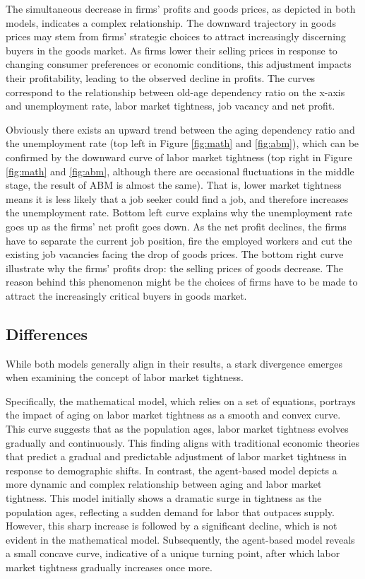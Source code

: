 \documentclass[ %
    final,
    scrbook,
    listoffigures,
    listoftables, 
    glossary]{cu-thesis}
\begin{document}
The simultaneous decrease in firms' profits and goods prices, as depicted in both models, indicates a complex relationship. The downward trajectory in goods prices may stem from firms' strategic choices to attract increasingly discerning buyers in the goods market. As firms lower their selling prices in response to changing consumer preferences or economic conditions, this adjustment impacts their profitability, leading to the observed decline in profits.
The curves correspond to the relationship between old-age dependency ratio on the x-axis and unemployment rate, labor market tightness, job vacancy and net profit. 
\fi

Obviously there exists an upward trend between the aging dependency ratio and the unemployment rate (top left in Figure \ref{fig:math} and \ref{fig:abm}), which can be confirmed by the downward curve of labor market tightness (top right in Figure \ref{fig:math} and \ref{fig:abm}, although there are occasional fluctuations in the middle stage, the result of ABM is almost the same). That is, lower market tightness means it is less likely that a job seeker could find a job, and therefore increases the unemployment rate. Bottom left curve explains why the unemployment rate goes up as the firms' net profit goes down. As the net profit declines, the firms have to separate the current job position, fire the employed workers and cut the existing job vacancies facing the drop of goods prices. The bottom right curve illustrate why the firms' profits drop: the selling prices of goods decrease. The reason behind this phenomenon might be the choices of firms have to be made to attract the increasingly critical buyers in goods market.

\subsection{Differences}
While both models generally align in their results, a stark divergence emerges when examining the concept of labor market tightness.

Specifically, the mathematical model, which relies on a set of equations, portrays the impact of aging on labor market tightness as a smooth and convex curve. This curve suggests that as the population ages, labor market tightness evolves gradually and continuously. This finding aligns with traditional economic theories that predict a gradual and predictable adjustment of labor market tightness in response to demographic shifts. In contrast, the agent-based model depicts a more dynamic and complex relationship between aging and labor market tightness. This model initially shows a dramatic surge in tightness as the population ages, reflecting a sudden demand for labor that outpaces supply. However, this sharp increase is followed by a significant decline, which is not evident in the mathematical model. Subsequently, the agent-based model reveals a small concave curve, indicative of a unique turning point, after which labor market tightness gradually increases once more.
\end{document}

